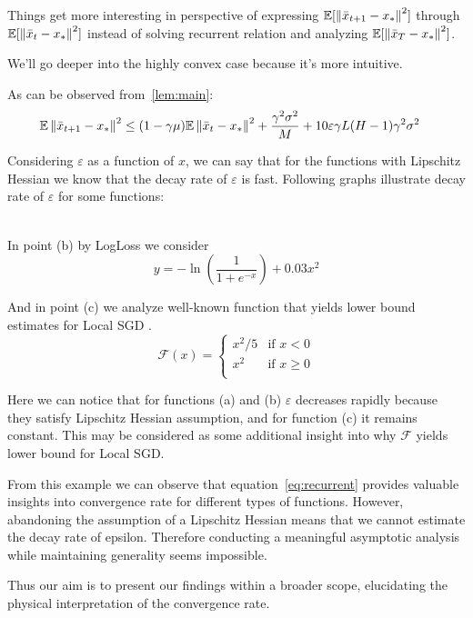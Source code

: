 Things get more interesting in perspective of expressing $\mathbb{E}[\left\|\bar{x}_{t+1} - x_*\right\|^2]$ through $\mathbb{E}[\left\|\bar{x}_{t} - x_*\right\|^2]$ instead of solving recurrent relation and analyzing $\mathbb{E}[\left\|\bar{x}_T - x_*\right\|^2]$. 

We'll go deeper into the highly convex case because it's more intuitive.

As can be observed from~\ref{lem:main}:
\begin{align}
     \mathbb{E} \left\|\bar{x}_{t+1}-x_*\right\|^2
    &\leq
    (1 - \gamma \mu) \mathbb{E} \left\|\bar{x}_t - x_*\right\|^2 
    + \frac{\gamma^2 \sigma^2}{M}
    + 10 \varepsilon \gamma L (H-1) \gamma^2 \sigma^2 \label{eq:recurrent}
\end{align}

Considering $\varepsilon$ as a function of $x$, we can say that for the functions with Lipschitz Hessian we know that the decay rate of $\varepsilon$ is fast. Following graphs illustrate decay rate of $\varepsilon$ for some functions:


\\

In point (b) by LogLoss we consider 
\begin{equation} \label{eq:logloss}
    y = -\ln\left(\frac{1}{1 + e^{-x}} \right) + 0.03 {x^2}
\end{equation}

And in point (c) we analyze well-known function that yields lower bound estimates for Local SGD \citep{LowerBound}.
\begin{equation} \label{eq:piecewise}
    \mathcal{F}(x) = \begin{cases} 
      x^2 / 5 & \text{if } x < 0 \\
      x^2 & \text{if } x \geq 0 \\
   \end{cases}
\end{equation}

Here we can notice that for functions (a) and (b) $\varepsilon$ decreases rapidly because they satisfy Lipschitz Hessian assumption, and for function (c) it remains constant. This may be considered as some additional insight into why 
$\mathcal{F}$ yields lower bound for Local SGD.

From this example we can observe that equation~\ref{eq:recurrent} provides valuable insights into convergence rate for different types of functions. However, abandoning the assumption of a Lipschitz Hessian means that we cannot estimate the decay rate of epsilon. Therefore conducting a meaningful asymptotic analysis while maintaining generality seems impossible.

Thus our aim is to present our findings within a broader scope, elucidating the physical interpretation of the convergence rate.
